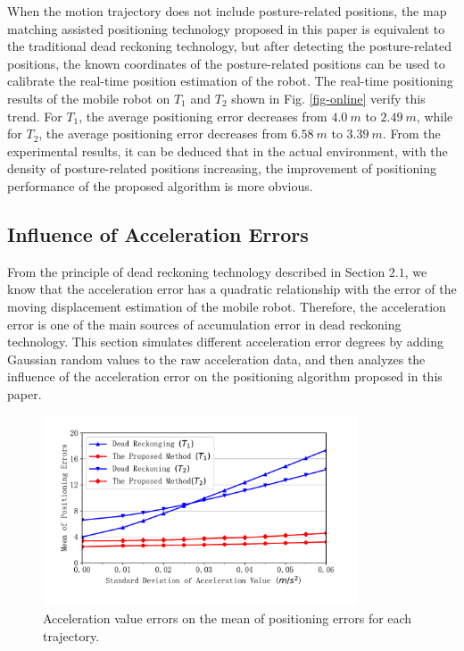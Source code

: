 \documentclass{llncs}
\begin{document}
When the motion trajectory does not include posture-related positions, the map matching assisted positioning technology proposed in this paper is equivalent to the traditional dead reckoning technology, but after detecting the posture-related positions, the known coordinates of the posture-related positions can be used to calibrate the real-time position estimation of the robot. The real-time positioning results of the mobile robot on $T_1$ and $T_2$ shown in Fig. \ref{fig-online} verify this trend. For $T_1$, the average positioning error decreases from $4.0\ m$ to $2.49\ m$, while for $T_2$, the average positioning error decreases from $6.58\ m$ to $3.39\ m$. From the experimental results, it can be deduced that in the actual environment, with the density of posture-related positions increasing, the improvement of positioning performance of the proposed algorithm is more obvious.


\subsection{Influence of Acceleration Errors}

From the principle of dead reckoning technology described in Section $2.1$, we know that the acceleration error has a quadratic relationship with the error of the moving displacement estimation of the mobile robot. Therefore, the acceleration error is one of the main sources of accumulation error in dead reckoning technology. This section simulates different acceleration error degrees by adding Gaussian random values to the raw acceleration data, and then analyzes the influence of the acceleration error on the positioning algorithm proposed in this paper.

\begin{figure}[!htbp]
	\centering
	\includegraphics[width=3.676in]{RobotMatch-AcceError}
	\caption{Acceleration value errors on the mean of positioning errors for each trajectory.}
	\label{fig-acce-error}
\end{figure}
\end{document}
